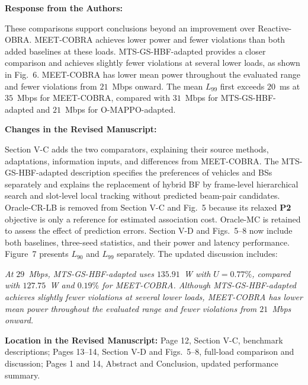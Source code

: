 \documentclass[11pt]{article}
\newenvironment{reviewedit}[1]
{\colorlet{responseblue}{#1}\colorlet{changeblue}{#1}\color{#1}}
{}
\newenvironment{authorresponse}
{\par\noindent\textcolor{responseblue}{\textbf{Response from the Authors:}}\par\color{responseblue}}
{\par}
\newenvironment{manuscriptchanges}
{\par\noindent\textcolor{changeblue}{\textbf{Changes in the Revised Manuscript:}}\par\color{changeblue}}
{\par}
\newcommand{\revisionlocation}[1]{%
  \par\noindent\textbf{Location in the Revised Manuscript:} #1\par
}
\begin{document}
\begin{reviewedit}{red}
\begin{authorresponse}
These comparisons support conclusions beyond an improvement over Reactive-OBRA.
MEET-COBRA achieves lower power and fewer violations than both added baselines
at these loads. MTS-GS-HBF-adapted provides a closer comparison and achieves
slightly fewer violations at several lower loads, as shown in Fig.~6.
MEET-COBRA has lower mean power throughout the evaluated range and fewer
violations from $21$~Mbps onward.
The mean $L_{99}$ first exceeds $20$~ms at $35$~Mbps for MEET-COBRA, compared
with $31$~Mbps for MTS-GS-HBF-adapted and $21$~Mbps for O-MAPPO-adapted.
\end{authorresponse}
\begin{manuscriptchanges}
Section V-C adds the two comparators, explaining their source methods,
adaptations, information inputs, and differences from MEET-COBRA.
The MTS-GS-HBF-adapted description specifies the preferences of vehicles and
BSs separately and explains the replacement of hybrid BF by frame-level
hierarchical search and slot-level local tracking without predicted beam-pair candidates.
Oracle-CR-LB is removed from Section V-C and Fig.~5 because its relaxed
\textbf{P2} objective is only a reference for estimated association cost.
Oracle-MC is retained to assess the effect of prediction errors.
Section V-D and Figs.~5--8 now include both baselines, three-seed statistics,
and their power and latency performance. Figure~7 presents $L_{90}$ and $L_{99}$
separately. The updated discussion includes:

\emph{At $29$~Mbps, MTS-GS-HBF-adapted uses $135.91$~W with $U=0.77\%$,
compared with $127.75$~W and $0.19\%$ for MEET-COBRA. Although
MTS-GS-HBF-adapted achieves slightly fewer violations at several lower loads,
MEET-COBRA has lower mean power throughout the evaluated range and fewer
violations from $21$~Mbps onward.}
\end{manuscriptchanges}
\revisionlocation{Page 12, Section V-C, benchmark descriptions;
Pages 13--14, Section V-D and Figs.~5--8, full-load comparison and discussion;
Pages 1 and 14, Abstract and Conclusion, updated performance summary.}
\end{reviewedit}
\end{document}
